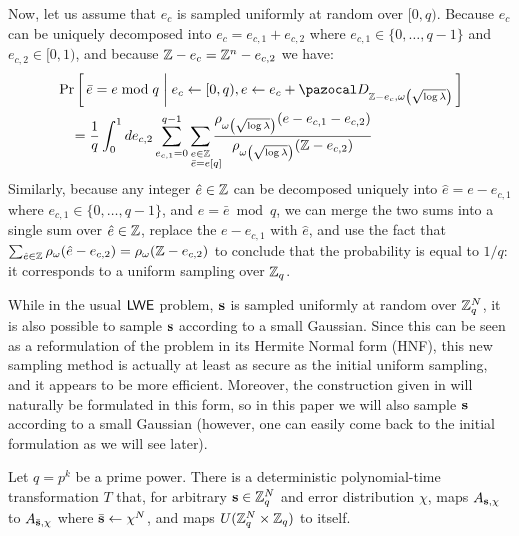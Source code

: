 {\begin{proofE}
    Now, let us assume that $e_c$ is sampled uniformly at random over $[0,q)$. Because $e_c$ can be uniquely decomposed into $e_c = e_{c,1} + e_{c,2}$ where $e_{c,1} \in \{0,\dots,q-1\}$ and $e_{c,2} \in [0,1)$, and because $\mathbb{Z}-e_c = \mathbb{Z}^n-e_{c,2}$ we have:
    \begin{align*}
      \begin{split}
        &\pr{\bar{e} = e \bmod q \middle| e_c \gets [0,q), e \gets e_c + \cD_{\Z-e_c, \omega\left(\sqrt{\log \lambda}\right)}}\\
        &\quad= \frac{1}{q} \int_0^1d e_{c,2} \sum_{e_{c,1} =0}^{q-1}
        \sum_{\substack{e \in \Z\\ \bar{e} = e \mathrlap{[q]}}} \frac{\rho_{\omega\left(\sqrt{\log \lambda}\right)}(e-e_{c,1}-e_{c,2})}{\rho_{\omega\left(\sqrt{\log \lambda}\right)}(\Z-e_{c,2})}
      \end{split}
    \end{align*}
    Similarly, because any integer $\hat{e} \in \mathbb{Z}$ can be decomposed uniquely into $\hat{e} = e - e_{c,1}$ where $e_{c,1} \in \{0,\dots,q-1\}$, and $e = \bar{e} \bmod q$, we can merge the two sums into a single sum over $\hat{e} \in \mathbb{Z}$, replace the $e-e_{c,1}$ with $\hat{e}$, and use the fact that $\sum_{\hat{e} \in \mathbb{Z}} \rho_{\omega}(\hat{e}-e_{c,2}) = \rho_\omega(\mathbb{Z}-e_{c,2})$ to conclude that the probability is equal to $1/q$: it corresponds to a uniform sampling over $\mathbb{Z}_q$.
  \end{proofE}


  While in the usual $\textsf{LWE}{}$ problem, $\mathbf{s}$ is sampled uniformly at random over $\mathbb{Z}_q^N$, it is also possible to sample $\mathbf{s}$ according to a small Gaussian. Since this can be seen as a reformulation of the problem in its Hermite Normal form (HNF), this new sampling method is actually at least as secure as the initial uniform sampling, and it appears to be more efficient. Moreover, the construction given in \cite{MP11} will naturally be formulated in this form, so in this paper we will also sample $\mathbf{s}$ according to a small Gaussian (however, one can easily come back to the initial formulation as we will see later).

  \begin{lemmaE}\label{lem:normalLWEreduction}
    Let $q = p^k$ be a prime power. There is a deterministic polynomial-time transformation $T$ that, for arbitrary $\mathbf{s} \in \mathbb{Z}_q^N$ and error distribution $\chi$, maps $A_{\mathbf{s},\chi}$ to $A_{\bar{\mathbf{s}},\chi}$ where $\bar{\mathbf{s}} \gets \chi^N$, and maps $U(\mathbb{Z}_q^N \times \mathbb{Z}_q)$ to itself.
  \end{lemmaE}

}

